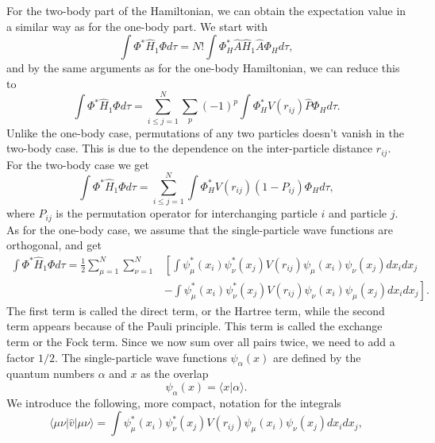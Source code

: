 \documentclass[../main.tex]{subfiles}
\begin{document}
For the two-body part of the Hamiltonian, we can obtain the expectation value in a similar way as for the one-body part. We start with
\begin{equation}
    \int \Phi^* \hat{H}_1 \Phi d\tau = N! \int \Phi_H^* \hat{A} \hat{H}_1 \hat{A} \Phi_H d\tau,
\end{equation}
and by the same arguments as for the one-body Hamiltonian, we can reduce this to
\begin{equation}
    \int \Phi^* \hat{H}_1 \Phi d\tau = \sum_{i \leq j= 1}^N \sum_p (-1)^p \int \Phi_H^* V(r_{ij}) \hat{P} \Phi_H d\tau.
\end{equation}
Unlike the one-body case, permutations of any two particles doesn't vanish in the two-body case. This is due to the dependence on the inter-particle distance $r_{ij}$. For the two-body case we get
\begin{equation}
    \int \Phi^* \hat{H}_1 \Phi d\tau = \sum_{i \leq j= 1}^N \int \Phi_H^* V(r_{ij}) (1-P_{ij}) \Phi_H d\tau,
\end{equation}
where $P_{ij}$ is the permutation operator for interchanging particle $i$ and particle $j$. As for the one-body case, we assume that the single-particle wave functions are orthogonal, and get
\begin{equation}\label{eq:two-body EV HF}
\begin{split}
    \int \Phi^* \hat{H}_1 \Phi d\tau = \frac{1}{2} \sum_{\mu=1}^N \sum_{\nu=1}^N &\left[ \int \psi_\mu^*(x_i) \psi_\nu^*(x_j) V(r_{ij}) \psi_\mu(x_i) \psi_\nu(x_j) dx_i dx_j\right.\\
    &\left. -\int \psi_\mu^*(x_i) \psi_\nu^*(x_j) V(r_{ij}) \psi_\nu(x_i) \psi_\mu(x_j) dx_i dx_j \right].
\end{split}
\end{equation}
The first term is called the direct term, or the Hartree term, while the second term appears because of the Pauli principle. This term is called the exchange term or the Fock term. Since we now sum over all pairs twice, we need to add a factor $1/2$. The single-particle wave functions $\psi_\alpha(x)$ are defined by the quantum numbers $\alpha$ and $x$ as the overlap
\begin{equation}
    \psi_\alpha(x) = \langle x \vert \alpha \rangle.
\end{equation}
We introduce the following, more compact, notation for the integrals
\begin{equation}
    \langle \mu \nu \vert \hat{v} \vert \mu \nu \rangle = \int \psi_\mu^*(x_i) \psi_\nu^*(x_j) V(r_{ij}) \psi_\mu(x_i) \psi_\nu(x_j) dx_i dx_j,
\end{equation}
\end{document}
